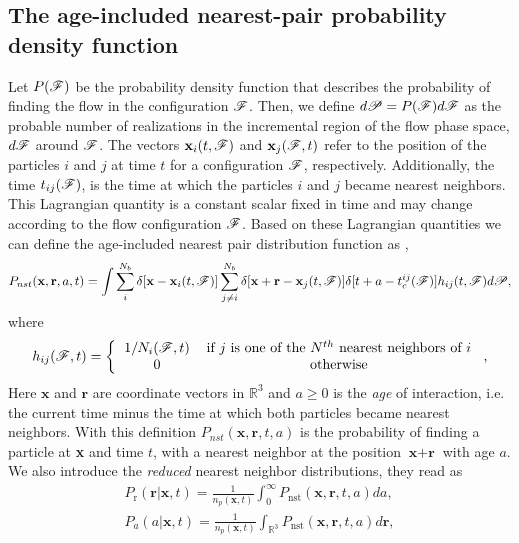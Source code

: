 \subsection{The age-included nearest-pair probability density function}
Let $P(\mathscr{F})$ be the probability density function that describes the probability of finding the flow in the configuration $\mathscr{F}$.
Then, we define $d\mathscr{P} = P(\mathscr{F})d\mathscr{F}$ as the probable number of realizations in the incremental region of the flow phase space, $d\mathscr{F}$ around $\mathscr{F}$.
The vectors  $\textbf{x}_i(t,\mathscr{F})$ and $\textbf{x}_j(\mathscr{F},t)$ refer to the position of the particles $i$ and $j$ at time $t$ for a configuration $\mathscr{F}$, respectively. 
Additionally, the time $t_{ij}(\mathscr{F})$, is the time at which the particles $i$ and $j$ became nearest neighbors.
This Lagrangian quantity is a constant scalar fixed in time and may change according to the flow configuration $\mathscr{F}$.
Based on these Lagrangian quantities we can define the age-included nearest pair distribution function as \citep{zhang2023evolution},
\begin{equation}
    P_{nst}(\textbf{x},\textbf{r},a,t) =
    \int \sum_{i}^{N_b}\delta[\textbf{x}-\textbf{x}_i(t,\FF)]
    \sum_{j\neq i}^{N_b}\delta[\textbf{x}+\textbf{r}-\textbf{x}_j(t,\FF)]
    \delta[t+a-t_c^{ij}(\FF)] 
    h_{ij} (t,\FF)
    d\mathscr{P},
    \label{eq:P_nstij}
\end{equation}
where
\begin{equation*}
    h_{ij}(\FF,t)
    = \left\{
        \begin{tabular}{cc}
            $1/N_i(\FF,t)$ & if $j$ is one of the $N^{th}$ nearest neighbors of $i$ \\
            0& otherwise
        \end{tabular}
        \right.,
\end{equation*}
Here $\textbf{x}$ and $\textbf{r}$ are coordinate vectors in $\mathbb{R}^3$ and $a \geq 0 $ is the \textit{age} of interaction, i.e. the current time minus the time at which both particles became nearest neighbors.   
With this definition $P_{nst}(\textbf{x},\textbf{r},t,a)$ is the probability of finding a particle at \textbf{x} and time $t$, with a nearest neighbor at the position $\textbf{x}+\textbf{r}$ with age $a$.
We also introduce the \textit{reduced} nearest neighbor distributions, they read as
\begin{align}
    P_\text{r}(\textbf{r}|\textbf{x},t)
    =\frac{1}{n_p(\textbf{x},t)}\int_0^\infty P_\text{nst}(\textbf{x},\textbf{r},t,a) da,\\
    P_a(a|\textbf{x},t)
    = \frac{1}{n_p(\textbf{x},t)}\int_{\mathbb{R}^3} P_\text{nst}(\textbf{x},\textbf{r},t,a) d\textbf{r},
\end{align}
